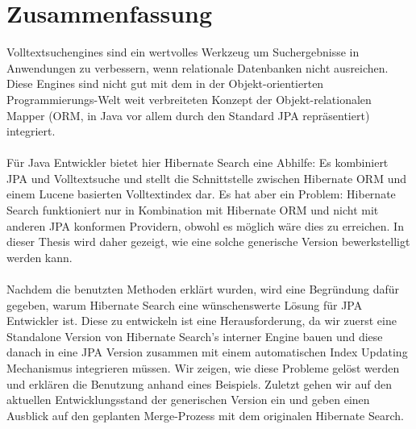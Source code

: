 \section*{Zusammenfassung}
Volltextsuchengines sind ein wertvolles Werkzeug um Suchergebnisse in Anwendungen zu verbessern, wenn relationale Datenbanken nicht ausreichen. Diese Engines sind nicht gut mit dem in der Objekt-orientierten Programmierungs-Welt weit verbreiteten Konzept der Objekt-relationalen Mapper (ORM, in Java vor allem durch den Standard JPA repräsentiert) integriert. 
\\\\
Für Java Entwickler bietet hier Hibernate Search eine Abhilfe: Es kombiniert JPA und Volltextsuche und stellt die Schnittstelle zwischen Hibernate ORM und einem Lucene basierten Volltextindex dar. Es hat aber ein Problem: Hibernate Search funktioniert nur in Kombination mit Hibernate ORM und nicht mit anderen JPA konformen Providern, obwohl es möglich wäre dies zu erreichen. In dieser Thesis wird daher gezeigt, wie eine solche generische Version bewerkstelligt werden kann.
\\\\
Nachdem die benutzten Methoden erklärt wurden, wird eine Begründung dafür gegeben, warum Hibernate Search eine wünschenswerte Lösung für JPA Entwickler ist. Diese zu entwickeln ist eine Herausforderung, da wir zuerst eine Standalone Version von Hibernate Search's interner Engine bauen und diese danach in eine JPA Version zusammen mit einem automatischen Index Updating Mechanismus integrieren müssen. Wir zeigen, wie diese Probleme gelöst werden und erklären die Benutzung anhand eines Beispiels. Zuletzt gehen wir auf den aktuellen Entwicklungsstand der generischen Version ein und geben einen Ausblick auf den geplanten Merge-Prozess mit dem originalen Hibernate Search.

